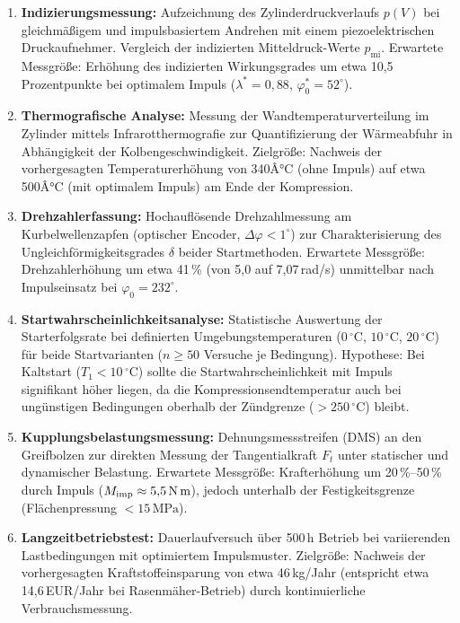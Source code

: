 ﻿\documentclass[a4paper,12pt]{article}
\begin{document}
\begin{enumerate}
  \item \textbf{Indizierungsmessung:} Aufzeichnung des Zylinderdruckverlaufs $p(V)$
    bei gleichmäßigem und impulsbasiertem Andrehen mit einem piezoelektrischen
    Druckaufnehmer. Vergleich der indizierten Mitteldruck-Werte $p_\text{mi}$.
    Erwartete Messgröße: Erhöhung des indizierten Wirkungsgrades um etwa
    10,5 Prozentpunkte bei optimalem Impuls ($\lambda^* = 0{,}88$,
    $\varphi_0^* = 52^\circ$).

  \item \textbf{Thermografische Analyse:} Messung der Wandtemperaturverteilung
    im Zylinder mittels Infrarotthermografie zur Quantifizierung der Wärmeabfuhr
    in Abhängigkeit der Kolbengeschwindigkeit. Zielgröße: Nachweis der
    vorhergesagten Temperaturerhöhung von 340Â°C (ohne Impuls) auf etwa
    500Â°C (mit optimalem Impuls) am Ende der Kompression.

  \item \textbf{Drehzahlerfassung:} Hochauflösende Drehzahlmessung am Kurbelwellenzapfen
    (optischer Encoder, $\Delta\varphi < 1^\circ$) zur Charakterisierung des Ungleichförmigkeitsgrades
    $\delta$ beider Startmethoden. Erwartete Messgröße: Drehzahlerhöhung um etwa
    41\,\% (von 5,0 auf 7,07\,rad/s) unmittelbar nach Impulseinsatz bei
    $\varphi_0 = 232^\circ$.

  \item \textbf{Startwahrscheinlichkeitsanalyse:} Statistische Auswertung der Starterfolgsrate
    bei definierten Umgebungstemperaturen ($0\,^\circ\text{C}$, $10\,^\circ\text{C}$,
    $20\,^\circ\text{C}$) für beide Startvarianten ($n \geq 50$ Versuche je Bedingung).
    Hypothese: Bei Kaltstart ($T_1 < 10\,^\circ\text{C}$) sollte die Startwahrscheinlichkeit
    mit Impuls signifikant höher liegen, da die Kompressionsendtemperatur auch bei
    ungünstigen Bedingungen oberhalb der Zündgrenze ($>250\,^\circ\text{C}$) bleibt.

  \item \textbf{Kupplungsbelastungsmessung:} Dehnungsmessstreifen (DMS) an den
    Greifbolzen zur direkten Messung der Tangentialkraft $F_t$ unter statischer
    und dynamischer Belastung. Erwartete Messgröße: Krafterhöhung um 20\,\%--50\,\%
    durch Impuls ($M_\text{imp} \approx 5{,}5\,\text{N\,m}$), jedoch unterhalb
    der Festigkeitsgrenze (Flächenpressung $<15\,\text{MPa}$).

  \item \textbf{Langzeitbetriebstest:} Dauerlaufversuch über 500\,h Betrieb
    bei variierenden Lastbedingungen mit optimiertem Impulsmuster. Zielgröße:
    Nachweis der vorhergesagten Kraftstoffeinsparung von etwa 46\,kg/Jahr
    (entspricht etwa 14,6\,EUR/Jahr bei Rasenmäher-Betrieb) durch
    kontinuierliche Verbrauchsmessung.
\end{enumerate}
\end{document}
